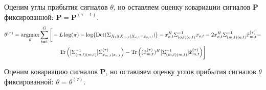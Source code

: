 \documentclass[11pt]{article}
\DeclareMathOperator*{\argmax}{argmax}
\DeclareMathOperator{\Det}{Det}
\begin{document}
\begin{center}
\fontsize{14}{18}\selectfont {}
\end{center}
Оценим углы прибытия сигналов $\theta$, но оставляем оценку ковариации сигналов $\mathbf{P}$ фиксированной: $\mathbf{P} = \mathbf{P}^{(\tau-1)}$.
\begin{equation*}
\begin{gathered}
\theta^{(\tau)}=\argmax_{\theta} \sum_{t=1}^G \bigg[-L \log(\pi) - \log (\Det(\Sigma_{X_t|(X_{m,t}|X_{o,t}=x_{o,t})})) - x_{o,t}^H \Sigma_{(o,t)(o,t)}^{-1}x_{o,t} - 2 x_{o,t}^H \Sigma_{(m,t)(o,t)}^{-1}\hat{x}_{m,t}^{(\tau)} - \\ \Tr \Big( [\Sigma_{(m,t)(m,t)}^{-1}]\Sigma^{(\tau)}_{x_{m,t}|x_{o,t}} \Big) - \Tr \Big((\hat{x}_{m,t}^{(\tau)})^H[\Sigma_{(m,t)(m,t)}^{-1}]\hat{x}_{m,t}^{(\tau)} \Big) \bigg]
\end{gathered}
\end{equation*}
\begin{center}
\fontsize{14}{18}\selectfont {}
\end{center}
Оценим ковариацию сигналов $\mathbf{P}$, но оставляем оценку углов прибытия сигналов $\theta$ фиксированной: $\theta = \theta^{(\tau)}$.
\begin{center}
\fontsize{16}{20}\selectfont {}
\end{center}
\begin{center}
\fontsize{14}{18}\selectfont {}
\end{center}
\begin{center}
\fontsize{14}{18}\selectfont {}
\end{center}
\begin{center}
\fontsize{14}{18}\selectfont {}
\end{center}
\begin{center}
\fontsize{14}{18}\selectfont {}
\end{center}
\begin{center}
\fontsize{16}{20}\selectfont {}
\end{center}
\end{document}
